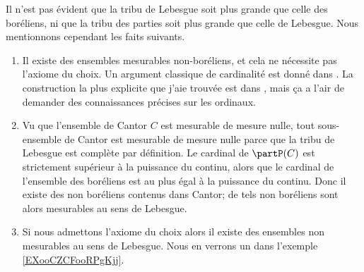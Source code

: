 \begin{remark}
    Il n'est pas évident que la tribu de Lebesgue soit plus grande que celle des boréliens, ni que la tribu des parties soit plus grande que celle de Lebesgue. Nous mentionnons cependant les faits suivants.
    \begin{enumerate}
        \item
            Il existe des ensembles mesurables non-boréliens, et cela ne nécessite pas l'axiome du choix. Un argument classique de cardinalité est donné dans \cite{SFYoobgQUp}. La construction la plus explicite que j'aie trouvée est dans \cite{XSHoosgoQa}, mais ça a l'air de demander des connaissances précises sur les ordinaux.
        \item
            Vu que l'ensemble de Cantor \( C\) est mesurable de mesure nulle, tout sous-ensemble de Cantor est mesurable de mesure nulle parce que la tribu de Lebesgue est complète par définition. Le cardinal de \( \partP(C)\) est strictement supérieur à la puissance du continu, alors que le cardinal de l'ensemble des boréliens est au plus égal à la puissance du continu. Donc il existe des non boréliens contenus dans Cantor; de tels non boréliens sont alors mesurables au sens de Lebesgue.

        \item
            Si nous admettons l'axiome du choix alors il existe des ensembles non mesurables au sens de Lebesgue. Nous en verrons un dans l'exemple \ref{EXooCZCFooRPgKjj}.
    \end{enumerate}
\end{remark}


